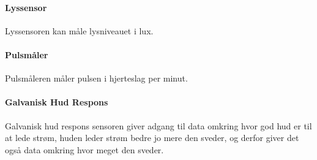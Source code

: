 \paragraph{Lyssensor}
Lyssensoren kan måle lysniveauet i lux.

\paragraph{Pulsmåler}
Pulsmåleren måler pulsen i hjerteslag per minut.

\paragraph{Galvanisk Hud Respons}
Galvanisk hud respons sensoren giver adgang til data omkring hvor god hud er til at lede strøm, huden leder strøm bedre jo mere den sveder, og derfor giver det også data omkring hvor meget den sveder.